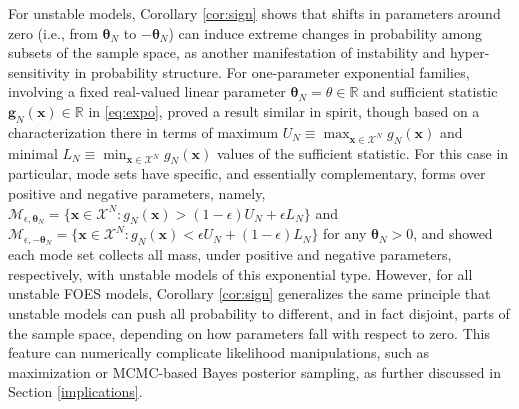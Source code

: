 \documentclass[numbib]{imamat}
\theoremstyle{theorem}
\theoremstyle{lemma}
\theoremstyle{example}
\theoremstyle{corollary}
\theoremstyle{definition}
\theoremstyle{remark}
\theoremstyle{approximation}
\theoremstyle{scheme}
\begin{document}
For unstable models, Corollary \ref{cor:sign} shows that shifts in parameters around zero (i.e., from \(\boldsymbol \theta_N\) to \(-\boldsymbol \theta_N\)) can induce extreme changes in probability among subsets of the sample space, as another manifestation of instability and hyper-sensitivity in probability structure. For one-parameter exponential families, involving a fixed real-valued linear parameter \(\boldsymbol \theta_N = \theta \in \mathbb{R}\) and sufficient statistic \(\boldsymbol g_N(\boldsymbol x)\in \mathbb{R}\) in \eqref{eq:expo}, \citet[Theorem 3]{schweinberger2011instability} proved a result similar in spirit, though based on a characterization there in terms of maximum \(U_N \equiv \max_{\boldsymbol x\in\mathcal{X}^N}g_N(\boldsymbol x)\) and minimal \(L_N \equiv \min_{\boldsymbol x\in\mathcal{X}^N}g_N(\boldsymbol x)\) values of the sufficient statistic. For this case in particular, mode sets have specific, and essentially complementary, forms over positive and negative parameters, namely, \(\mathcal{M}_{\epsilon, \boldsymbol \theta_N} = \{\boldsymbol x \in\mathcal{X}^N: g_N(\boldsymbol x) > (1-\epsilon) U_N + \epsilon L_N \}\) and \(\mathcal{M}_{\epsilon, -\boldsymbol \theta_N} = \{\boldsymbol x \in\mathcal{X}^N: g_N(\boldsymbol x) < \epsilon U_N + (1-\epsilon) L_N \}\) for any \(\boldsymbol \theta_N>0\), and
\citet[Theorem 3]{schweinberger2011instability} showed each mode set collects all mass, under positive and negative parameters, respectively, with unstable models of this exponential type. However, for all unstable FOES models, Corollary \ref{cor:sign} generalizes the same principle that unstable models can push all probability to different, and in fact disjoint, parts of the sample space, depending on how parameters fall with respect to zero. This feature can numerically complicate likelihood manipulations, such as maximization or MCMC-based Bayes posterior sampling, as further discussed in Section \ref{implications}.
\end{document}
